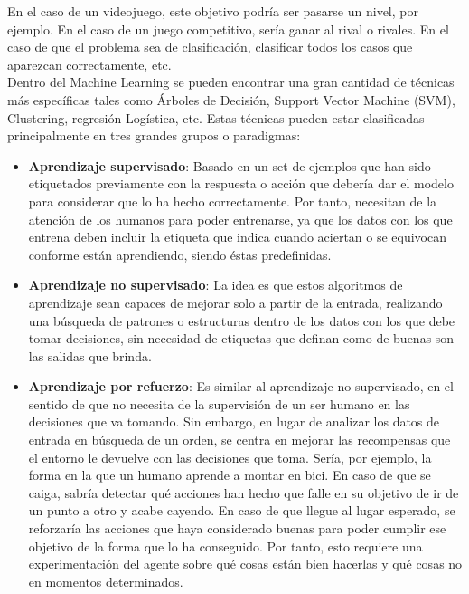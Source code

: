 \documentclass[11pt,fleqn]{book} %
\begin{document}
En el caso de un videojuego, este objetivo podría ser pasarse un nivel, por ejemplo. En el caso de un juego competitivo, sería ganar al rival o rivales. En el caso de que el problema sea de clasificación, clasificar todos los casos que aparezcan correctamente, etc. \\

Dentro del Machine Learning se pueden encontrar una gran cantidad de técnicas más específicas tales como Árboles de Decisión, Support Vector Machine (SVM), Clustering, regresión Logística, etc. Estas técnicas pueden estar clasificadas principalmente en tres grandes grupos o paradigmas: \cite{book:alphago} \\

\begin{itemize}
	\item \textbf{Aprendizaje supervisado}: Basado en un set de ejemplos que han sido etiquetados previamente con la respuesta o acción que debería dar el modelo para considerar que lo ha hecho correctamente. Por tanto, necesitan de la atención de los humanos para poder entrenarse, ya que los datos con los que entrena deben incluir la etiqueta que indica cuando aciertan o se equivocan conforme están aprendiendo, siendo éstas predefinidas. \\
	 
	\item \textbf{Aprendizaje no supervisado}: La idea es que estos algoritmos de aprendizaje sean capaces de mejorar solo a partir de la entrada, realizando una búsqueda de patrones o estructuras dentro de los datos con los que debe tomar decisiones, sin necesidad de etiquetas que definan como de buenas son las salidas que brinda. \\
	
	\item \textbf{Aprendizaje por refuerzo}: Es similar al aprendizaje no supervisado, en el sentido de que no necesita de la supervisión de un ser humano en las decisiones que va tomando. Sin embargo, en lugar de analizar los datos de entrada en búsqueda de un orden, se centra en mejorar las recompensas que el entorno le devuelve con las decisiones que toma. Sería, por ejemplo, la forma en la que un humano aprende a montar en bici. En caso de que se caiga, sabría detectar qué acciones han hecho que falle en su objetivo de ir de un punto a otro y acabe cayendo. En caso de que llegue al lugar esperado, se reforzaría las acciones que haya considerado buenas para poder cumplir ese objetivo de la forma que lo ha conseguido. Por tanto, esto requiere una experimentación del agente sobre qué cosas están bien hacerlas y qué cosas no en momentos determinados. \\
	
\end{itemize}
\end{document}
